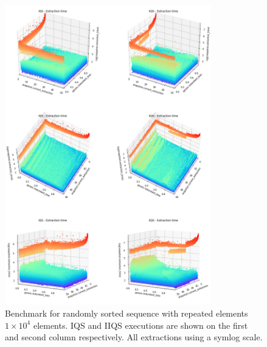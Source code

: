 \begin{figure}[!ht]
    \centering
    \includegraphics[width=0.8\textwidth]{./fragments/04_experimental_execution/images/01_basebenchmark_07_extraction_bias.png}
    \caption{Benchmark for randomly sorted sequence with repeated elements $1\times10^4$ elements. IQS and IIQS executions are shown on the first and second column respectively. All extractions using a symlog scale.}
    \label{FIG:BENCHMARK_07_NOISE_BIAS}
\end{figure}

